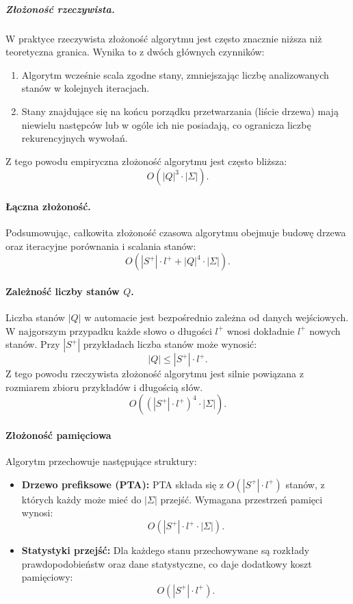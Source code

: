 \subparagraph*{Złożoność rzeczywista.}  
W praktyce rzeczywista złożoność algorytmu jest często znacznie niższa niż teoretyczna granica. Wynika to z dwóch głównych czynników:  
\begin{enumerate}
    \item Algorytm wcześnie scala zgodne stany, zmniejszając liczbę analizowanych stanów w kolejnych iteracjach.  
    \item Stany znajdujące się na końcu porządku przetwarzania (liście drzewa) mają niewielu następców lub w ogóle ich nie posiadają, co ogranicza liczbę rekurencyjnych wywołań.  
\end{enumerate}  

Z tego powodu empiryczna złożoność algorytmu jest często bliższa:  
\[
O(|Q|^3 \cdot |\Sigma|).
\]  

\paragraph*{Łączna złożoność.}  
Podsumowując, całkowita złożoność czasowa algorytmu obejmuje budowę drzewa oraz iteracyjne porównania i scalania stanów:  
\[
O(|S^+| \cdot l^+ + |Q|^4 \cdot |\Sigma|).
\]

\paragraph*{Zależność liczby stanów \( Q \).}  
Liczba stanów \( |Q| \) w automacie jest bezpośrednio zależna od danych wejściowych. W najgorszym przypadku każde słowo o długości \( l^+ \) wnosi dokładnie \( l^+ \) nowych stanów. Przy \( |S^+| \) przykładach liczba stanów może wynosić:  
\[
|Q| \leq |S^+| \cdot l^+.
\]  
Z tego powodu rzeczywista złożoność algorytmu jest silnie powiązana z rozmiarem zbioru przykładów i długością słów.   
\[
O((|S^+| \cdot l^+)^4 \cdot |\Sigma|).
\]


\paragraph*{Złożoność pamięciowa}  
Algorytm przechowuje następujące struktury:  
\begin{itemize}  
    \item \textbf{Drzewo prefiksowe (PTA):}  
    PTA składa się z \( O(|S^+| \cdot l^+) \) stanów, z których każdy może mieć do \( |\Sigma| \) przejść. Wymagana przestrzeń pamięci wynosi:  
    \[
    O(|S^+| \cdot l^+ \cdot |\Sigma|).
    \]  

    \item \textbf{Statystyki przejść:}  
    Dla każdego stanu przechowywane są rozkłady prawdopodobieństw oraz dane statystyczne, co daje dodatkowy koszt pamięciowy:  
    \[
    O(|S^+| \cdot l^+).
    \]  
\end{itemize}  

